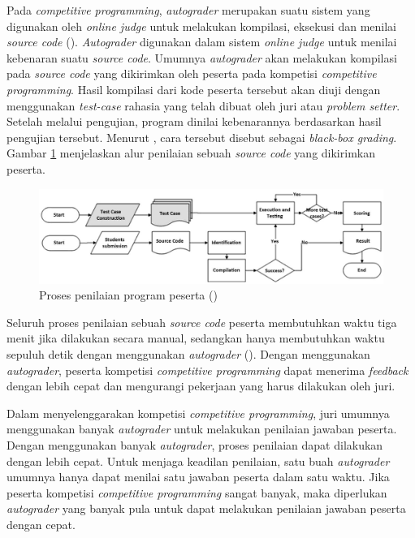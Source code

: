 \par Pada \textit{competitive programming}, \textit{autograder} merupakan suatu sistem yang digunakan oleh \textit{online judge} untuk melakukan kompilasi, eksekusi dan menilai \textit{source code} (\cite{danutamalms}). \textit{Autograder} digunakan dalam sistem \textit{online judge} untuk menilai kebenaran suatu \textit{source code}. Umumnya \textit{autograder} akan melakukan kompilasi pada \textit{source code} yang dikirimkan oleh peserta pada kompetisi \textit{competitive programming}. Hasil kompilasi dari kode peserta tersebut akan diuji dengan menggunakan \textit{test-case} rahasia yang telah dibuat oleh juri atau \textit{problem setter}. Setelah melalui pengujian, program dinilai kebenarannya berdasarkan hasil pengujian tersebut. Menurut \cite{jordanioi}, cara tersebut disebut sebagai \textit{black-box grading}. Gambar \ref{fig:grading-process} menjelaskan alur penilaian sebuah \textit{source code} yang dikirimkan peserta.

\begin{figure}
	\centering
	\includegraphics[width=\textwidth]{images/grading-process}
	\caption{Proses penilaian program peserta (\cite{danutamalms})}
	\label{fig:grading-process}
\end{figure}

\par Seluruh proses penilaian sebuah \textit{source code} peserta membutuhkan waktu tiga menit jika dilakukan secara manual, sedangkan hanya membutuhkan waktu sepuluh detik dengan menggunakan \textit{autograder} (\cite{danutamalms}). Dengan menggunakan \textit{autograder}, peserta kompetisi \textit{competitive programming} dapat menerima \textit{feedback} dengan lebih cepat dan mengurangi pekerjaan yang harus dilakukan oleh juri.

\par Dalam menyelenggarakan kompetisi \textit{competitive programming}, juri umumnya menggunakan banyak \textit{autograder} untuk melakukan penilaian jawaban peserta. Dengan menggunakan banyak \textit{autograder}, proses penilaian dapat dilakukan dengan lebih cepat. Untuk menjaga keadilan penilaian, satu buah \textit{autograder} umumnya hanya dapat menilai satu jawaban peserta dalam satu waktu. Jika peserta kompetisi \textit{competitive programming} sangat banyak, maka diperlukan \textit{autograder} yang banyak pula untuk dapat melakukan penilaian jawaban peserta dengan cepat.

